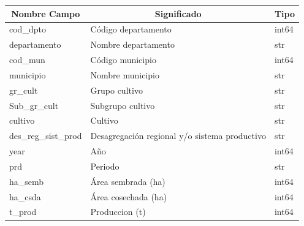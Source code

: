 \documentclass[12pt,a4paper]{article}
\begin{document}
\begin{table}[H]
    \centering
    \begin{tabular}{|l|l|l|}
        \hline
        \multicolumn{1}{|c|}{\textbf{Nombre Campo}} & \multicolumn{1}{c|}{\textbf{Significado}}     & \multicolumn{1}{c|}{\textbf{Tipo}} \\ \hline
        cod\_dpto                                   & Código departamento                           & int64                              \\ \hline
        departamento                                & Nombre departamento                           & str                                \\ \hline
        cod\_mun                                    & Código municipio                              & int64                              \\ \hline
        municipio                                   & Nombre municipio                              & str                                \\ \hline
        gr\_cult                                    & Grupo cultivo                                 & str                                \\ \hline
        Sub\_gr\_cult                               & Subgrupo cultivo                              & str                                \\ \hline
        cultivo                                     & Cultivo                                       & str                                \\ \hline
        des\_reg\_sist\_prod                        & Desagregación regional y/o sistema productivo & str                                \\ \hline
        year                                        & Año                                           & int64                              \\ \hline
        prd                                         & Periodo                                       & str                                \\ \hline
        ha\_semb                                    & Área sembrada (ha)                            & int64                              \\ \hline
        ha\_csda                                    & Área cosechada (ha)                           & int64                              \\ \hline
        t\_prod                                     & Produccion (t)                                & int64                              \\ \hline

\end{tabular}
\end{table}
\end{document}
